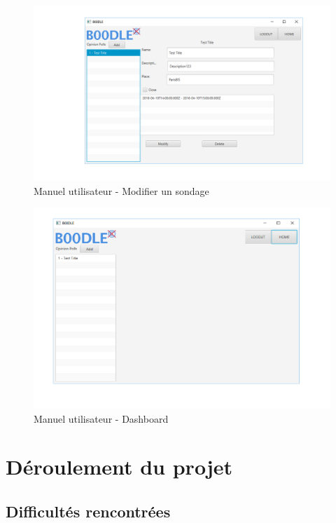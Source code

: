 \documentclass[titlepage]{report}
\begin{document}
\begin{figure}[h]
	\caption{Manuel utilisateur - Modifier un sondage}
	\label{um_modifierSondage}
	\centering
	\includegraphics[width=\textwidth]{figures/CapturesEcrans/modifyPoll.png}
\end{figure}

\begin{figure}[h]
	\caption{Manuel utilisateur - Dashboard}
	\label{um_dashboard}
	\centering
	\includegraphics[width=\textwidth]{figures/CapturesEcrans/emptyDashboard.png}
\end{figure}

\clearpage

\chapter{Déroulement du projet}

\section{Difficultés rencontrées}
\end{document}

